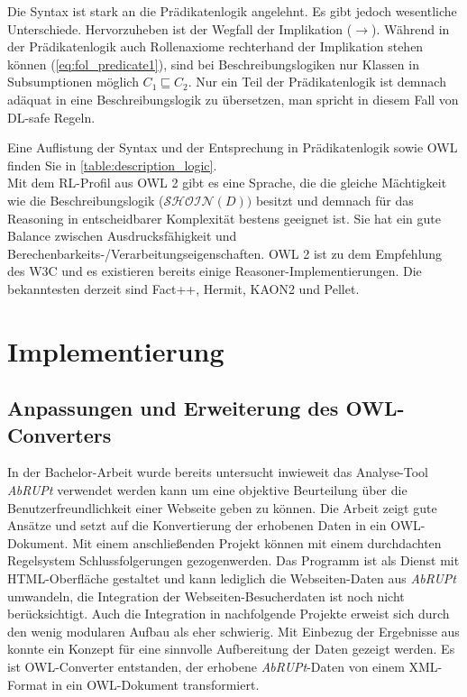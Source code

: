 \documentclass[runningheads,a4paper]{llncs}
\begin{document}
Die Syntax ist stark an die Prädikatenlogik angelehnt. 
Es gibt jedoch wesentliche Unterschiede. 
Hervorzuheben ist der Wegfall der Implikation (\(\to\)). 
Während in der Prädikatenlogik auch Rollenaxiome rechterhand der Implikation stehen können (\eqref{eq:fol_predicate1}), sind bei Beschreibungslogiken nur Klassen in Subsumptionen möglich \(C_1 \sqsubseteq C_2\).
Nur ein Teil der Prädikatenlogik ist demnach adäquat in eine Beschreibungslogik zu übersetzen, man spricht in diesem Fall von DL-safe Regeln. 

Eine Auflistung der Syntax und der Entsprechung in Prädikatenlogik sowie OWL finden Sie in \ref{table:description_logic}.
\\
Mit dem RL-Profil aus OWL 2 \cite{owl2rl} gibt es eine Sprache, die die gleiche Mächtigkeit wie die Beschreibungslogik (\(\mathcal{SHOIN}(D))\) besitzt und demnach für das Reasoning in entscheidbarer Komplexität bestens geeignet ist.
Sie hat ein gute Balance zwischen Ausdrucksfähigkeit und Berechenbarkeits-/Verarbeitungseigenschaften.
OWL 2 ist zu dem Empfehlung des W3C und es existieren bereits einige Reasoner-Implementierungen. 
Die bekanntesten derzeit sind Fact++, Hermit, KAON2 und Pellet.


\section{Implementierung}

\subsection{Anpassungen und Erweiterung des OWL-Converters}

In der Bachelor-Arbeit \cite{Brieger} wurde bereits untersucht inwieweit das Analyse-Tool \textit{AbRUPt} \cite{url_abrupt} verwendet werden kann um eine objektive Beurteilung über die Benutzerfreundlichkeit einer Webseite geben zu können. 
Die Arbeit zeigt gute Ansätze und setzt auf die Konvertierung der erhobenen Daten in ein OWL-Dokument. 
Mit einem anschließenden Projekt können mit einem durchdachten Regelsystem Schlussfolgerungen gezogenwerden. 
Das Programm ist als Dienst mit HTML-Oberfläche gestaltet und kann lediglich die Webseiten-Daten aus \textit{AbRUPt} umwandeln, die Integration der Webseiten-Besucherdaten ist noch nicht berücksichtigt. 
Auch die Integration in nachfolgende Projekte erweist sich durch den wenig modularen Aufbau als eher schwierig. 
Mit Einbezug der Ergebnisse aus \cite{Martin} konnte ein Konzept für eine sinnvolle Aufbereitung der Daten gezeigt werden. 
Es ist OWL-Converter entstanden, der erhobene \textit{AbRUPt}-Daten von einem XML-Format in ein OWL-Dokument transformiert.
\end{document}
